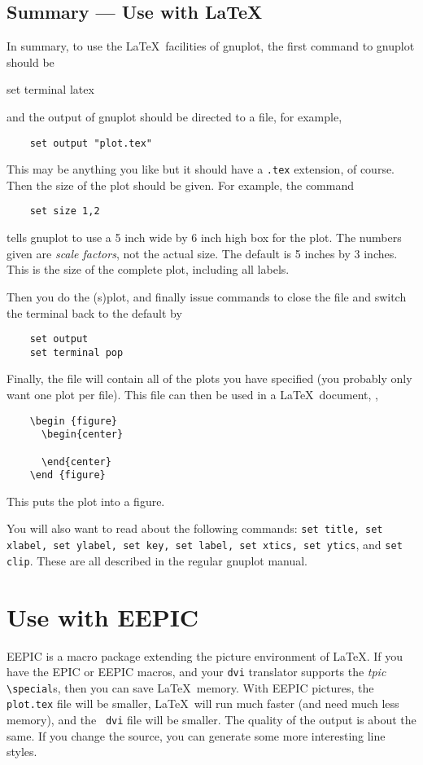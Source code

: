 \subsection{Summary --- Use with \LaTeX}
In summary, to use the \LaTeX\ facilities of gnuplot, the first
command to gnuplot should be
\begin{syntax}
    set terminal latex
\end{syntax}
and the output of gnuplot should be directed to a file, for example,
\begin{verbatim}
    set output "plot.tex"
\end{verbatim}
This may be anything you like but it should have a {\tt .tex} extension,
of course. Then the size of the plot should be given. For example, the
command
\begin{verbatim}
    set size 1,2
\end{verbatim}
tells gnuplot to use a 5 inch wide by 6 inch high box for the plot.
The numbers given are {\em scale factors}, not the actual size.  The
default is 5 inches by 3 inches.  This is the size of the complete
plot, including all labels.

Then you do the (s)plot, and finally issue commands to close the file and
switch the terminal back to the default by
\begin{verbatim}
    set output
    set terminal pop
\end{verbatim}

Finally, the file will contain all of the plots you have
specified (you probably only want one plot per file). This file can
then be used in a \LaTeX\ document, \eg,

\singlespace
\begin{verbatim}
    \begin {figure}
      \begin{center}
        
      \end{center}
    \end {figure}
\end{verbatim}
\currentspace
This puts the plot into a figure.

You will also want to read about the following commands: {\tt set
title, set xlabel, set ylabel, set key, set label, set xtics, set
ytics}, and {\tt set clip}.  These are all described in the regular
gnuplot manual.

\section{Use with EEPIC}
\label{s:eepic}
EEPIC is a macro package extending the picture environment of \LaTeX.
If you have the EPIC or EEPIC macros, and your {\tt dvi} translator
supports the {\em tpic\/} \verb+\special+s, then you can save \LaTeX\
memory.  With EEPIC pictures, the {\tt plot.tex} file will be smaller,
\LaTeX\ will run much faster (and need much less memory), and the {\tt
dvi} file will be smaller. The quality of the output is about the
same. If you change the source, you can generate some more interesting
line styles.

